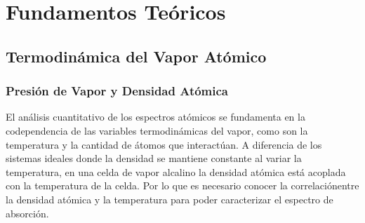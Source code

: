 \section{Fundamentos Teóricos}
\subsection{Termodinámica del Vapor Atómico}
\subsubsection{Presión de Vapor y Densidad Atómica}
El análisis cuantitativo de los espectros atómicos se fundamenta en la codependencia de las variables termodinámicas del vapor, como son la temperatura y la cantidad de átomos que interactúan. A diferencia de los sistemas ideales donde la densidad se mantiene constante al variar la temperatura, en una celda de vapor alcalino la densidad atómica está acoplada con la temperatura de la celda. Por lo que es necesario conocer la correlaciónentre la densidad atómica y la temperatura para poder caracterizar el espectro de absorción.

